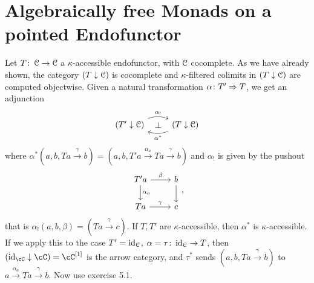 \documentclass[a4paper,11pt,oneside,openany]{scrbook}
\begin{document}
\section{Algebraically free Monads on a pointed Endofunctor}

Let $ T\colon \operatorname{\mathcal{C}} \to \operatorname{\mathcal{C}} $ a $ \kappa $-accessible endofunctor, with $ \operatorname{\mathcal{C}} $ cocomplete.
As we have already shown, the category $ (T \downarrow \operatorname{\mathcal{C}} )$ is cocomplete and $
\kappa $-filtered colimits in $ (T\downarrow\operatorname{\mathcal{C}}) $ are computed objectwise.
Given a natural transformation $ \alpha \colon T' \Rightarrow T $, we get an adjunction
\begin{displaymath}
	\begin{tikzcd}
		(T' \downarrow \C) \arrow[r, "\alpha_!", bend left=20]
		\arrow[from=r, "\alpha^*", bend left=20]
		\arrow[r, phantom, "\bot"]
		& (T \downarrow \C)
	\end{tikzcd}
\end{displaymath}
where $\alpha^*(a,b,Ta\xrightarrow{\gamma}b)=(a,b,T'a\xrightarrow{\alpha_a}Ta\xrightarrow{\gamma}b)$
and $\alpha_!$ is given by the pushout
\begin{displaymath}
	\begin{tikzcd}
		T'a \arrow[r,"\beta"]\arrow[d,"\alpha_a"]& b\arrow[d]\\
		Ta \arrow[r, "\gamma"] & c
	\end{tikzcd},
\end{displaymath}
that is $\alpha_!(a,b,\beta)= (Ta\xrightarrow{\gamma} c)$.
If $ T,T' $ are $ \kappa $-accessible, then $ \alpha ^* $ is $ \kappa $-accessible.
If we apply this to the case $ T' = \operatorname{id}_{\operatorname{\mathcal{C}}} $, $ \alpha=\tau\colon \operatorname{id}_{\operatorname{\mathcal{C}}} \to
T$, then $(\id_\cC\downarrow\cC)=\cC ^{[1]}$ is the arrow category, and
$ \tau^* $ sends $ (a,b,Ta \xrightarrow{\gamma}b) $ to $ a
\xrightarrow{\alpha_a} Ta \xrightarrow{\gamma} b $.
Now use exercise 5.1.
\end{document}
